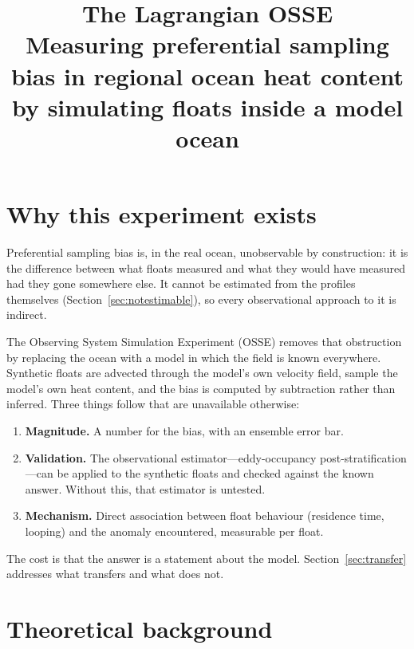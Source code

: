 \documentclass[11pt]{article}
\title{The Lagrangian OSSE\\[2mm]
\large Measuring preferential sampling bias in regional ocean heat content\\
by simulating floats inside a model ocean}
\author{}
\date{}
\begin{document}
\maketitle

\sloppy

\section{Why this experiment exists}

Preferential sampling bias is, in the real ocean, unobservable by construction: it is the
difference between what floats measured and what they would have measured had they gone
somewhere else. It cannot be estimated from the profiles themselves
(Section~\ref{sec:notestimable}), so every observational approach to it is indirect.

The Observing System Simulation Experiment (OSSE) removes that obstruction by replacing the
ocean with a model in which the field is known everywhere. Synthetic floats are advected
through the model's own velocity field, sample the model's own heat content, and the bias is
computed by subtraction rather than inferred. Three things follow that are unavailable
otherwise:

\begin{enumerate}[leftmargin=*]
  \item \textbf{Magnitude.} A number for the bias, with an ensemble error bar.
  \item \textbf{Validation.} The observational estimator---eddy-occupancy
        post-stratification---can be applied to the synthetic floats and checked against the
        known answer. Without this, that estimator is untested.
  \item \textbf{Mechanism.} Direct association between float behaviour (residence time,
        looping) and the anomaly encountered, measurable per float.
\end{enumerate}

The cost is that the answer is a statement about the model. Section~\ref{sec:transfer}
addresses what transfers and what does not.

\section{Theoretical background}
\end{document}
